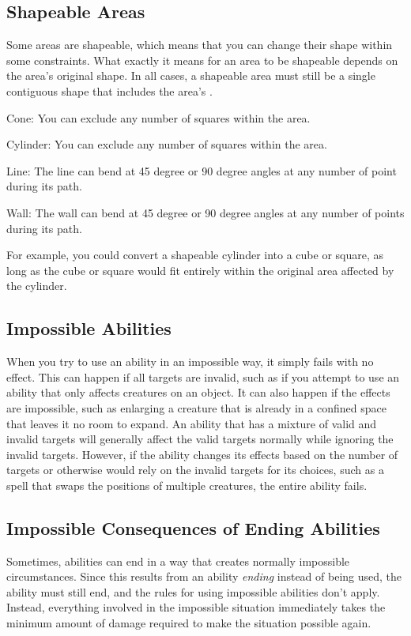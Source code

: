   \subsection{Shapeable Areas}\label{Shapeable Areas}
    Some areas are shapeable, which means that you can change their shape within some constraints.
    What exactly it means for an area to be shapeable depends on the area's original shape.
    In all cases, a shapeable area must still be a single contiguous shape that includes the area's .
    \begin{raggeditemize}
      \item Cone: You can exclude any number of squares within the area.
      \item Cylinder: You can exclude any number of squares within the area.
      \item Line: The line can bend at 45 degree or 90 degree angles at any number of point during its path.
      \item Wall: The wall can bend at 45 degree or 90 degree angles at any number of points during its path.
    \end{raggeditemize}

    For example, you could convert a shapeable cylinder into a cube or square, as long as the cube or square would fit entirely within the original area affected by the cylinder.

  \subsection{Impossible Abilities}
    When you try to use an ability in an impossible way, it simply fails with no effect.
    This can happen if all targets are invalid, such as if you attempt to use an ability that only affects creatures on an object.
    It can also happen if the effects are impossible, such as enlarging a creature that is already in a confined space that leaves it no room to expand.
    An ability that has a mixture of valid and invalid targets will generally affect the valid targets normally while ignoring the invalid targets.
    However, if the ability changes its effects based on the number of targets or otherwise would rely on the invalid targets for its choices, such as a spell that swaps the positions of multiple creatures, the entire ability fails.

  \subsection{Impossible Consequences of Ending Abilities}
    Sometimes, abilities can end in a way that creates normally impossible circumstances.
    Since this results from an ability \textit{ending} instead of being used, the ability must still end, and the rules for using impossible abilities don't apply.
    Instead, everything involved in the impossible situation immediately takes the minimum amount of damage required to make the situation possible again.

